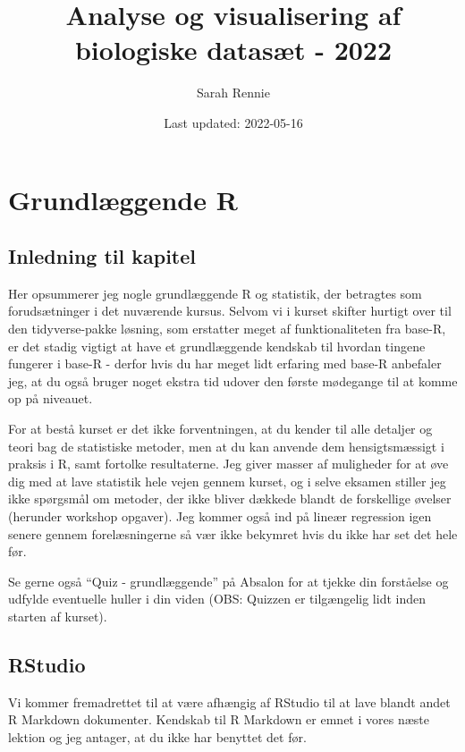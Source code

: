 \documentclass[
]{book}
\title{Analyse og visualisering af biologiske datasæt - 2022}
\author{Sarah Rennie}
\date{Last updated: 2022-05-16}
\begin{document}
\maketitle

{
\setcounter{tocdepth}{1}
\tableofcontents
}
\hypertarget{baser}{%
\chapter{Grundlæggende R}\label{baser}}

\hypertarget{inledning-til-kapitel}{%
\section{Inledning til kapitel}\label{inledning-til-kapitel}}

Her opsummerer jeg nogle grundlæggende R og statistik, der betragtes som forudsætninger i det nuværende kursus. Selvom vi i kurset skifter hurtigt over til den tidyverse-pakke løsning, som erstatter meget af funktionaliteten fra base-R, er det stadig vigtigt at have et grundlæggende kendskab til hvordan tingene fungerer i base-R - derfor hvis du har meget lidt erfaring med base-R anbefaler jeg, at du også bruger noget ekstra tid udover den første mødegange til at komme op på niveauet.

For at bestå kurset er det ikke forventningen, at du kender til alle detaljer og teori bag de statistiske metoder, men at du kan anvende dem hensigtsmæssigt i praksis i R, samt fortolke resultaterne. Jeg giver masser af muligheder for at øve dig med at lave statistik hele vejen gennem kurset, og i selve eksamen stiller jeg ikke spørgsmål om metoder, der ikke bliver dækkede blandt de forskellige øvelser (herunder workshop opgaver). Jeg kommer også ind på lineær regression igen senere gennem forelæsningerne så vær ikke bekymret hvis du ikke har set det hele før.

Se gerne også ``Quiz - grundlæggende'' på Absalon for at tjekke din forståelse og udfylde eventuelle huller i din viden (OBS: Quizzen er tilgængelig lidt inden starten af kurset).

\hypertarget{rstudio}{%
\section{RStudio}\label{rstudio}}

Vi kommer fremadrettet til at være afhængig af RStudio til at lave blandt andet R Markdown dokumenter. Kendskab til R Markdown er emnet i vores næste lektion og jeg antager, at du ikke har benyttet det før.
\end{document}
